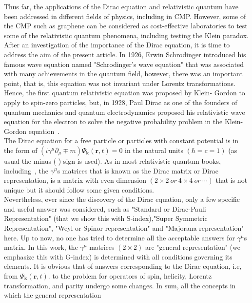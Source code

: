 \documentclass[twocolumn,aps,prb,showpacs]{revtex4-1}
\begin{document}
Thus far, the applications of the Dirac equation and relativistic quantum have been addressed
in different fields of physics, including in CMP. However, some of the CMP such as graphene can be considered as cost-effective laboratories to test some of the
relativistic quantum phenomena, including testing the Klein paradox.\\
After an investigation of the importance of the Dirac equation, it is time to address the aim of
the present article. 
In 1926, Erwin Schrodinger introduced his famous wave equation named "Schrodinger's
wave equation" that was associated with many achievements in the quantum field, however,
there was an important point, that is, this equation was not invariant under Lorentz
transformations. Hence, the first quantum relativistic equation was proposed by Klein-
Gordon to apply to spin-zero particles, but, in 1928, Paul Dirac as one of the founders of
quantum mechanics and quantum electrodynamics proposed his relativistic wave equation for
the electron to solve the negative probability problem in the Klein-Gordon equation~\cite{Ref14}.\\ 
The Dirac equation for a free particle or particles
with constant potential is in the form of $ \left( i\gamma^{\mu}\partial_{\mu}\mp m\right) \Psi_{\textbf{k}}\left( \textbf{r},t\right) =0 $ in the natural units $ \left( \hbar=c=1\right)  $ (as
usual the minus (-) sign is used). As in most relativistic quantum books, including~\cite{Ref14}, the $ \gamma^{\mu} $s
matrices that is known as the Dirac matrix or Dirac representation, is a matrix with even dimension $ \left( 2\times2 \ or \ 4\times4 \ or \ \cdots \right) $ that
is not unique but it should follow some given conditions.\\
Nevertheless, ever since the discovery of the Dirac equation, only a few specific and useful
answer was considered, such as "Standard or Dirac-Pauli Representation" (that we show this with S-index),"Super Symmetric Representation", "Weyl or Spinor representation" and "Majorana representation" here. Up to now, no
one has tried to determine all the acceptable answers for $ \gamma^{\mu} $s matrix. In this work, the $ \gamma^{\mu} $ matrices $\left( 2\times2 \right) $ are
"general representation" (we emphasize this with G-index) is determined with all
conditions governing its elements. It is obvious that of answers corresponding to the Dirac
equation, i.e, from $ \Psi_{\textbf{k}}\left( \textbf{r},t\right) $. to the problem for operators of spin, helicity, Lorentz
transformation, and parity undergo some changes. In sum, all the concepts in which the general representation
\end{document}
